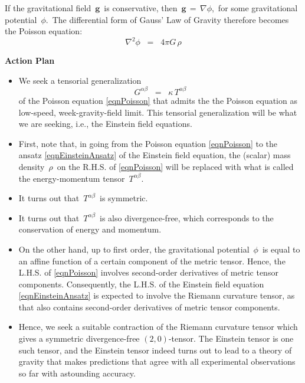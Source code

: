 \vskip 0.3cm
\noindent
If the gravitational field \,$\mathbf{g}$\, is conservative, then
\,$\mathbf{g} \,=\, \nabla \phi$,\,
for some gravitational potential \,$\phi$.\,
The differential form of Gauss' Law of Gravity therefore becomes the Poisson equation:
\begin{equation}\label{eqnPoisson}
\nabla^{2}\phi \;\; = \;\; 4 \pi G \, \rho
\end{equation}


\begin{remark}
\mbox{}
\vskip -0.01cm
\end{remark}


\vskip 0.3cm
\noindent
\textbf{Action Plan}
\begin{itemize}
\item
	We seek a tensorial generalization
	\begin{equation}\label{eqnEinsteinAnsatz}
	G^{\alpha\beta} \;\; = \;\; \kappa\,T^{\alpha\beta}
	\end{equation}
	of the Poisson equation \eqref{eqnPoisson} that admits the the Poisson equation
	as low-speed, week-gravity-field limit.
	This tensorial generalization will be what we are seeking, i.e.,
	the Einstein field equations.
\item
	First, note that, in going
	from the Poisson equation \eqref{eqnPoisson}
	to the ansatz \eqref{eqnEinsteinAnsatz} of the Einstein field equation,
	the (scalar) mass density \,$\rho$\, on the R.H.S. of \eqref{eqnPoisson}
	will be replaced with what is called the energy-momentum tensor \,$T^{\alpha\beta}$.
\item
	It turns out that \,$T^{\alpha\beta}$\, is symmetric.
\item
	It turns out that \,$T^{\alpha\beta}$\, is also divergence-free,
	which corresponds to the conservation of energy and momentum.
\item
	On the other hand, up to first order, the gravitational potential \,$\phi$\,
	is equal to an affine function of a certain component of the metric tensor.
	Hence, the L.H.S. of \eqref{eqnPoisson} involves second-order derivatives of metric tensor components.
	Consequently, the L.H.S. of the Einstein field equation \eqref{eqnEinsteinAnsatz} is expected to involve
	the Riemann curvature tensor, as that also contains second-order derivatives of metric tensor components.
\item
	Hence, we seek a suitable contraction of the Riemann curvature tensor
	which gives a symmetric divergence-free $(2,0)$-tensor.
	The Einstein tensor is one such tensor, and the Einstein tensor
	indeed turns out to lead to a theory of gravity that makes predictions that agree
	with all experimental observations so far with astounding accuracy.
\end{itemize}


